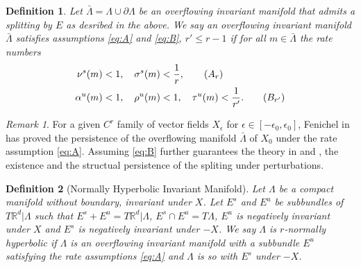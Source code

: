 \documentclass[usletter,11pt]{article}
\newcommand{\tcr}{\textcolor{red}}
\newcommand{\tcb}{\textcolor{blue}}
\newtheorem{definition}{Definition}[section]
\theoremstyle{remark}
\newtheorem{remark}{Remark}[section]
\begin{document}
\begin{definition} \label{def:over}
Let $\bar{\Lambda}=\Lambda \cup \partial\Lambda$  be an overflowing invariant manifold that admits a splitting by $E$ as desribed in the above. We say an overflowing invariant manifold $\bar{\Lambda}$ satisfies assumptions \eqref{eq:A} and \eqref{eq:B}, $r'\le r-1$ if for all $m\in \bar{\Lambda}$ the  rate numbers
\begin{align}
\nu^s(m)&<1, \quad \sigma^s(m)<\frac{1}{r}, \label{eq:A}\tag{$A_r$}   \\
\alpha^u(m)&<1, \quad \rho^u(m)<1, \quad \tau^u(m)<\frac{1}{r'}. \label{eq:B}\tag{$B_{r'}$}  
\end{align}
\end{definition}
\begin{remark}
For a given $C^r$ family of vector fields $X_\epsilon$ for $\epsilon\in[-\epsilon_0,\epsilon_0]$, Fenichel  in \cite{fenichel_persistence_1972} has proved the persistence of the overflowing manifold $\bar\Lambda$ of $X_0$ under the rate assumption \eqref{eq:A}. Assuming \eqref{eq:B} further guarantees the theory in \cite[pp. 84--85]{fenichel_asymptotic_1977} and \cite[Theorem 9.1]{fenichel_geometric_1979},  the existence and the structual persistence of the spliting under perturbations.
\end{remark}
\begin{definition}[Normally Hyperbolic Invariant Manifold] \label{def:nhim}
 Let $\Lambda$ be a compact manifold without boundary, invariant under $X$. Let $E^s$ and $E^u$ be subbundles of $T \mathbb{R}^d|\Lambda$ such that $E^s + E^u = T \mathbb{R}^d|\Lambda$, $E^s\cap E^u=T\Lambda$, $E^u$ is negatively invariant under $X$ and $E^s$ is negatively invariant under $-X$. 
 We say $\Lambda$ is $r$-normally hyperbolic if $\Lambda$ is an overflowing invariant manifold with a subbundle $E^u$ satisfying the rate assumptions \eqref{eq:A} and $\Lambda$ is so with $E^s$ under $-X$. 
\end{definition}


% 
\end{document}
